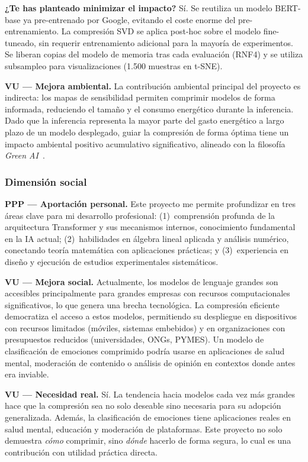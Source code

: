 \textbf{¿Te has planteado minimizar el impacto?} Sí. Se reutiliza un
modelo BERT-base ya pre-entrenado por Google, evitando el coste enorme
del pre-entrenamiento. La compresión SVD se aplica post-hoc sobre el
modelo fine-tuneado, sin requerir entrenamiento adicional para la
mayoría de experimentos. Se liberan copias del modelo de memoria tras
cada evaluación (RNF4) y se utiliza subsampleo para visualizaciones
(1.500 muestras en t-SNE).

\textbf{VU --- Mejora ambiental.} La contribución ambiental principal
del proyecto es indirecta: los mapas de sensibilidad permiten comprimir
modelos de forma informada, reduciendo el tamaño y el consumo
energético durante la inferencia. Dado que la inferencia representa la
mayor parte del gasto energético a largo plazo de un modelo desplegado,
guiar la compresión de forma óptima tiene un impacto ambiental positivo
acumulativo significativo, alineado con la filosofía
\emph{Green AI}~\cite{schwartz2020green}.

\subsubsection{Dimensión social}

\textbf{PPP --- Aportación personal.} Este proyecto me permite
profundizar en tres áreas clave para mi desarrollo profesional:
(1)~comprensión profunda de la arquitectura Transformer y sus
mecanismos internos, conocimiento fundamental en la IA actual;
(2)~habilidades en álgebra lineal aplicada y análisis numérico,
conectando teoría matemática con aplicaciones prácticas; y
(3)~experiencia en diseño y ejecución de estudios experimentales
sistemáticos.

\textbf{VU --- Mejora social.} Actualmente, los modelos de lenguaje
grandes son accesibles principalmente para grandes empresas con
recursos computacionales significativos, lo que genera una brecha
tecnológica. La compresión eficiente democratiza el acceso a estos
modelos, permitiendo su despliegue en dispositivos con recursos
limitados (móviles, sistemas embebidos) y en organizaciones con
presupuestos reducidos (universidades, ONGs, PYMES). Un modelo de
clasificación de emociones comprimido podría usarse en aplicaciones de
salud mental, moderación de contenido o análisis de opinión en
contextos donde antes era inviable.

\textbf{VU --- Necesidad real.} Sí. La tendencia hacia modelos cada
vez más grandes hace que la compresión sea no solo deseable sino
necesaria para su adopción generalizada. Además, la clasificación de
emociones tiene aplicaciones reales en salud mental, educación y
moderación de plataformas. Este proyecto no solo demuestra
\emph{cómo} comprimir, sino \emph{dónde} hacerlo de forma segura, lo
cual es una contribución con utilidad práctica directa.


